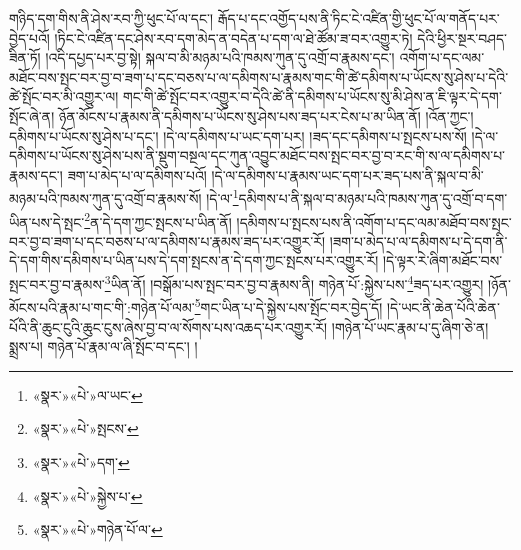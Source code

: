 གཉིད་དག་གིས་ནི་ཤེས་རབ་ཀྱི་ཕུང་པོ་ལ་དང་། རྒོད་པ་དང་འགྱོད་པས་ནི་ཏིང་ངེ་འཛིན་གྱི་ཕུང་པོ་ལ་གནོད་པར་བྱེད་པའོ། །ཏིང་ངེ་འཛིན་དང་ཤེས་རབ་དག་མེད་ན་བདེན་པ་དག་ལ་ཐེ་ཚོམ་ཟ་བར་འགྱུར་ཏེ། དེའི་ཕྱིར་སྔར་བཤད་ཟིན་ཏོ། །འདི་དཔྱད་པར་བྱ་སྟེ། སྐལ་བ་མི་མཉམ་པའི་ཁམས་ཀུན་དུ་འགྲོ་བ་རྣམས་དང་། འགོག་པ་དང་ལམ་མཐོང་བས་སྤང་བར་བྱ་བ་ཟག་པ་དང་བཅས་པ་ལ་དམིགས་པ་རྣམས་གང་གི་ཚེ་དམིགས་པ་ཡོངས་སུ་ཤེས་པ་དེའི་ཚེ་སྤོང་བར་མི་འགྱུར་ལ། གང་གི་ཚེ་སྤོང་བར་འགྱུར་བ་དེའི་ཚེ་ནི་དམིགས་པ་ཡོངས་སུ་མི་ཤེས་ན་ཇི་ལྟར་དེ་དག་སྤོང་ཞེ་ན། ཉོན་མོངས་པ་རྣམས་ནི་དམིགས་པ་ཡོངས་སུ་ཤེས་པས་ཟད་པར་ངེས་པ་མ་ཡིན་ནོ། །འོན་ཀྱང་། དམིགས་པ་ཡོངས་སུ་ཤེས་པ་དང་། །དེ་ལ་དམིགས་པ་ཡང་དག་པར། །ཟད་དང་དམིགས་པ་སྤངས་པས་སོ། །དེ་ལ་དམིགས་པ་ཡོངས་སུ་ཤེས་པས་ནི་སྡུག་བསྔལ་དང་ཀུན་འབྱུང་མཐོང་བས་སྤང་བར་བྱ་བ་རང་གི་ས་ལ་དམིགས་པ་རྣམས་དང་། ཟག་པ་མེད་པ་ལ་དམིགས་པའོ། །དེ་ལ་དམིགས་པ་རྣམས་ཡང་དག་པར་ཟད་པས་ནི་སྐལ་བ་མི་མཉམ་པའི་ཁམས་ཀུན་དུ་འགྲོ་བ་རྣམས་སོ། །དེ་ལ་\footnote{«སྣར་»«པེ་»ལ་ཡང་}དམིགས་པ་ནི་སྐལ་བ་མཉམ་པའི་ཁམས་ཀུན་དུ་འགྲོ་བ་དག་ཡིན་པས་དེ་སྤང་\footnote{«སྣར་»«པེ་»སྤངས་}ན་དེ་དག་ཀྱང་སྤངས་པ་ཡིན་ནོ། །དམིགས་པ་སྤངས་པས་ནི་འགོག་པ་དང་ལམ་མཐོབ་བས་སྤང་བར་བྱ་བ་ཟག་པ་དང་བཅས་པ་ལ་དམིགས་པ་རྣམས་ཟད་པར་འགྱུར་རོ། །ཟག་པ་མེད་པ་ལ་དམིགས་པ་དེ་དག་ནི་དེ་དག་གིས་དམིགས་པ་ཡིན་པས་དེ་དག་སྤངས་ན་དེ་དག་ཀྱང་སྤངས་པར་འགྱུར་རོ། །དེ་ལྟར་རེ་ཞིག་མཐོང་བས་སྤང་བར་བྱ་བ་རྣམས་\footnote{«སྣར་»«པེ་»དག་}ཡིན་ནོ། །བསྒོམ་པས་སྤང་བར་བྱ་བ་རྣམས་ནི། གཉེན་པོ་:སྐྱེས་པས་\footnote{«སྣར་»«པེ་»སྐྱེས་པ་}ཟད་པར་འགྱུར། །ཉོན་མོངས་པའི་རྣམ་པ་གང་གི་:གཉེན་པོ་ལམ་\footnote{«སྣར་»«པེ་»གཉེན་པོ་ལ་}གང་ཡིན་པ་དེ་སྐྱེས་པས་སྤོང་བར་བྱེད་དོ། །དེ་ཡང་ནི་ཆེན་པོའི་ཆེན་པོའི་ནི་ཆུང་ངུའི་ཆུང་ངུས་ཞེས་བྱ་བ་ལ་སོགས་པས་འཆད་པར་འགྱུར་རོ། །གཉེན་པོ་ཡང་རྣམ་པ་དུ་ཞིག་ཅེ་ན། སྨྲས་པ། གཉེན་པོ་རྣམ་ལ་ཞི་སྤོང་བ་དང་། །
